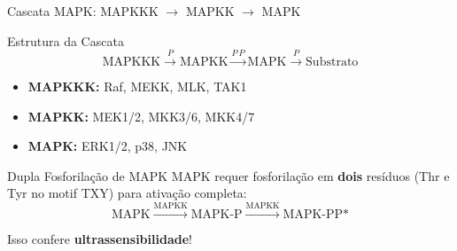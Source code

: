 \begin{frame}{Cascata MAPK: MAPKKK $\rightarrow$ MAPKK $\rightarrow$ MAPK}
\begin{block}{Estrutura da Cascata}
\begin{equation*}
\text{MAPKKK} \xrightarrow{P} \text{MAPKK} \xrightarrow{P \, P} \text{MAPK} \xrightarrow{P} \text{Substrato}
\end{equation*}

\begin{itemize}
    \item \textbf{MAPKKK:} Raf, MEKK, MLK, TAK1
    \item \textbf{MAPKK:} MEK1/2, MKK3/6, MKK4/7
    \item \textbf{MAPK:} ERK1/2, p38, JNK
\end{itemize}
\end{block}

\begin{exampleblock}{Dupla Fosforilação de MAPK}
MAPK requer fosforilação em \textbf{dois} resíduos (Thr e Tyr no motif TXY) para ativação completa:
\begin{equation*}
\text{MAPK} \xrightarrow{\text{MAPKK}} \text{MAPK-P} \xrightarrow{\text{MAPKK}} \text{MAPK-PP*}
\end{equation*}

Isso confere \textbf{ultrassensibilidade}!
\end{exampleblock}
\end{frame}

